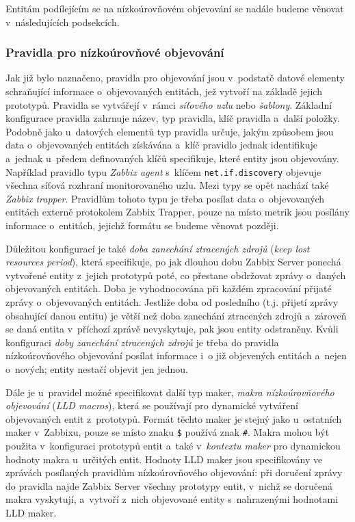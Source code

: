 \documentclass[czech, ing, kiv, he, iso690]{fasthesis}
\begin{document}
Entitám podílejícím se na nízkoúrovňovém objevování se nadále budeme věnovat v~následujících podsekcích.

\subsubsection{Pravidla pro nízkoúrovňové objevování}

Jak již bylo naznačeno, pravidla pro objevování jsou v~podstatě datové elementy schraňující informace o~objevovaných entitách, jež vytvoří na základě jejich prototypů. Pravidla se vytvářejí v~rámci \emph{síťového uzlu} nebo \emph{šablony}. Základní konfigurace pravidla zahrnuje název, typ pravidla, klíč pravidla a~další položky. Podobně jako u~datových elementů typ pravidla určuje, jakým způsobem jsou data o~objevovaných entitách získávána a~klíč pravidlo jednak identifikuje a~jednak u~předem definovaných klíčů specifikuje, které entity jsou objevovány. Například pravidlo typu \emph{Zabbix agent} s~klíčem \texttt{net.if.discovery} objevuje všechna síťová rozhraní monitorovaného uzlu. Mezi typy se opět nachází také \emph{Zabbix trapper}. Pravidlům tohoto typu je třeba posílat data o~objevovaných entitách externě protokolem Zabbix Trapper, pouze na místo metrik jsou posílány informace o~entitách, jejichž formátu se budeme věnovat později.

Důležitou konfigurací je také \emph{doba zanechání ztracených zdrojů} (\emph{keep lost resources period}), která specifikuje, po jak dlouhou dobu Zabbix Server ponechá vytvořené entity z~jejich prototypů poté, co přestane obdržovat zprávy o~daných objevovaných entitách. Doba je vyhodnocována při každém zpracování přijaté zprávy o~objevovaných entitách. Jestliže doba od posledního  (t.j. přijetí zprávy obsahující danou entitu) je větší než doba zanechání ztracených zdrojů a~zároveň se daná entita v~příchozí zprávě nevyskytuje, pak jsou entity odstraněny. Kvůli konfiguraci \emph{doby zanechání ztracených zdrojů} je třeba do pravidla nízkoúrovňového objevování posílat informace i~o již objevených entitách a~nejen o~nových; entity nestačí objevit jen jednou.

Dále je u~pravidel možné specifikovat další typ maker, \emph{makra nízkoúrovňového objevování} (\emph{LLD macros}), která se používají pro dynamické vytváření objevovaných entit z~prototypů. Formát těchto maker je stejný jako u~ostatních maker v~Zabbixu, pouze se místo znaku \texttt{\$} používá znak \texttt{\#}. Makra mohou být použita v~konfiguraci prototypů entit a~také v~\emph{kontextu maker} pro dynamickou  hodnoty makra u~určitých entit. Hodnoty LLD maker jsou specifikovány ve zprávách posílaných pravidlům nízkoúrovňového objevování: při doručení zprávy do pravidla najde Zabbix Server všechny prototypy entit, v~nichž se doručená makra vyskytují, a~vytvoří z~nich objevované entity s~nahrazenými hodnotami LLD maker.
\end{document}
